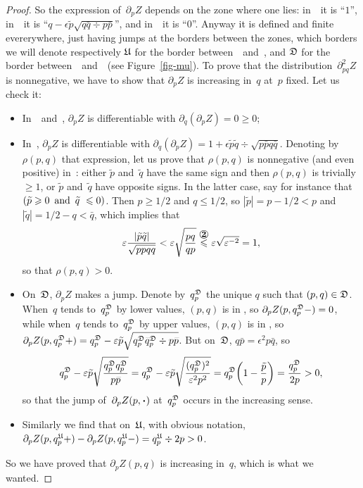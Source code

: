 \begin{proof}
So the expression of~$\partial_pZ$ depends on the zone where one lies:
in~\onecirc\ it is ``$1$'', in~\twocirc\ it is
``$q-\epsilon\tilde{p}\sqrt{q\bar{q} \div p\bar{p}}$'',
and in~\threecirc\ it is ``$0$''. Anyway it is defined and finite evererywhere,
just having jumps at the borders between the zones, which borders we will denote
respectively $\mathfrak{U}$ for the border between~\onecirc\ and~\twocirc,
and $\mathfrak{D}$ for the border between~\twocirc\ and~\threecirc\ (see Figure~\ref{fig-mu}).
To prove that the distribution~$\partial^2_{pq}Z$ is nonnegative, we have to show
that $\partial_pZ$ is increasing in~$q$ at~$p$ fixed.
Let us check it:
%
\begin{itemize}
\item In~\onecirc\ and~\threecirc, $\partial_pZ$ is differentiable with
$\partial_q(\partial_pZ) = 0 \geq 0$;
%
\item In~\twocirc, $\partial_pZ$ is differentiable with
$\partial_q(\partial_pZ) = 1 + \epsilon \tilde{p}\tilde{q} \div \sqrt{p\bar{p}q\bar{q}}$.
Denoting by~$\rho(p,q)$ that expression, let us prove that
$\rho(p,q)$ is nonnegative (and even positive) in~\twocirc:
either $\tilde{p}$ and~$\tilde{q}$ have the same sign and then $\rho(p,q)$ is trivially $\geq 1$,
or $\tilde{p}$ and~$\tilde{q}$ have opposite signs.
In the latter case, say for instance that $(\tilde{p}\geq0\enskip\text{and}\enskip \tilde{q}\ \leq 0)$.
Then $p\geq1/2$ and $q\leq1/2$, so $|\tilde{p}|=p-1/2<p$
and $|\tilde{q}|=1/2-q<\bar{q}$, which implies that
\[ \epsilon \frac{|\tilde{p}\tilde{q}|}{\sqrt{p\bar{p}q\bar{q}}}
< \epsilon \sqrt{\frac{p\bar{q}}{q\bar{p}}} \stackrel{\twocirc}{\leq} \epsilon\sqrt{\epsilon^{-2}} = 1 ,\]
so that $\rho(p,q) > 0$.
%
\item On~$\mathfrak{D}$, $\partial_pZ$ makes a jump. Denote by~$q^{\mathfrak{D}}_p$ the unique
$q$ such that $(p,q)\in\mathfrak{D}$. When~$q$ tends to~$q^{\mathfrak{D}}_p$ by lower values,
$(p,q)$ is in \threecirc, so $\partial_pZ(p,q^{\mathfrak{D}}_p-) = 0$,
while when~$q$ tends to~$q^{\mathfrak{D}}_p$ by upper values,
$(p,q)$ is in \twocirc, so $\partial_pZ(p,q^{\mfrak{D}}_p+) =
q^{\mfrak{D}}_p-\epsilon\tilde{p}\sqrt{q^{\mfrak{D}}_p\bar{q}^{\mfrak{D}}_p \div p\bar{p}}$.
But on~$\mathfrak{D}$, $q\bar{p} = \epsilon^2p\bar{q}$, so
\[ q^{\mfrak{D}}_p- \epsilon\tilde{p}\sqrt{\frac{q^{\mfrak{D}}_p\bar{q}^{\mfrak{D}}_p}{p\bar{p}}}
= q^{\mfrak{D}}_p - \epsilon\tilde{p}\sqrt{\frac{(q^{\mfrak{D}}_p)^2}{\epsilon^2p^2}}
= q^{\mfrak{D}}_p \bigg( 1 - \frac{\tilde{p}}{p} \bigg) = \frac{q^{\mfrak{D}}_p}{2p} > 0 ,\]
so that the jump of~$\partial_pZ(p,\Bcdot)$ at~$q^{\mathfrak{D}}_p$
occurs in the increasing sense.
%
\item Similarly we find that on~$\mathfrak{U}$, with obvious notation,
$\partial_pZ(p,q^{\mfrak{U}}_p+) - \partial_pZ(p,q^{\mfrak{U}}_p-) = \bar{q}^{\mfrak{U}}_p \div 2\bar{p} > 0$.
\end{itemize}
So we have proved that $\partial_pZ(p,q)$ is increasing in~$q$, which is what we wanted.
\end{proof}

